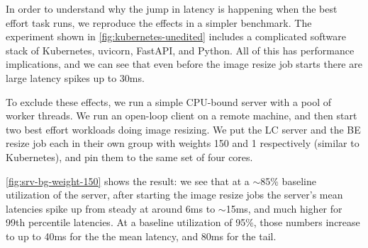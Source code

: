 In order to understand why the jump in latency is happening when the best effort
task runs, we reproduce the effects in a simpler benchmark. The experiment shown
in \autoref{fig:kubernetes-unedited} includes a complicated software stack of
Kubernetes, uvicorn, FastAPI, and Python. All of this has performance
implications, and we can see that even before the image resize job starts there
are large latency spikes up to 30ms.

To exclude these effects, we run a simple CPU-bound server with a pool of worker
threads. We run an open-loop client on a remote machine, and then start two best
effort workloads doing image resizing. We put the LC server and the BE resize
job each in their own \cgroups{} group with weights 150 and 1 respectively
(similar to Kubernetes), and pin them to the same set of four cores.

\autoref{fig:srv-bg-weight-150} shows the result: we see that at a $\sim$85\%
baseline utilization of the server, after starting the image resize jobs the
server's mean latencies spike up from steady at around 6ms to $\sim$15ms, and
much higher for 99th percentile latencies. At a baseline utilization of 95\%,
those numbers increase to up to 40ms for the the mean latency, and 80ms for the
tail.

